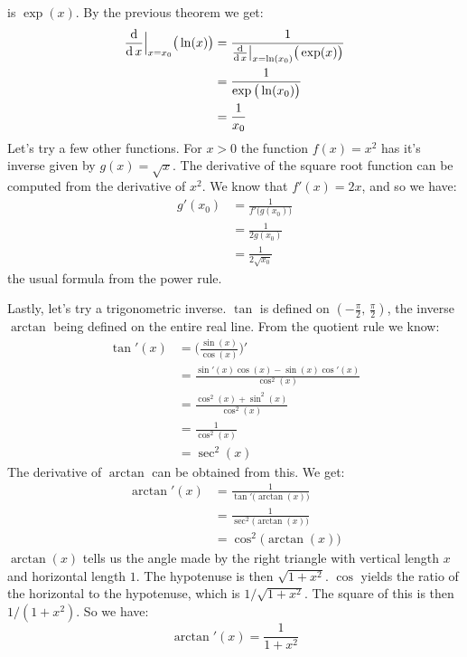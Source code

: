 \documentclass{article}
\theoremstyle{plain}
\begin{document}
    is $\exp(x)$. By the previous theorem we get:
    \begin{align}
        \frac{\textrm{d}}{\textrm{d}\,x}\Big|_{x=x_{0}}\big(\ln(x)\big)
            &=\frac{1}{%
                \frac{\textrm{d}}{\textrm{d}\,x}
                \big|_{x=\ln(x_{0})}\big(\exp(x)\big)%
            }\\
            &=\frac{1}{\exp\big(\ln(x_{0})\big)}\\
            &=\frac{1}{x_{0}}
    \end{align}
    Let's try a few other functions. For $x>0$ the function
    $f(x)=x^{2}$ has it's inverse given by $g(x)=\sqrt{x}$. The derivative
    of the square root function can be computed from the derivative of $x^2$.
    We know that $f'(x)=2x$, and so we have:
    \begin{align}
        g'(x_{0})&=\frac{1}{f'\big(g(x_{0})\big)}\\
            &=\frac{1}{2g(x_{0})}\\
            &=\frac{1}{2\sqrt{x_{0}}}
    \end{align}
    the usual formula from the power rule.
    \par\hfill\par
    Lastly, let's try a trigonometric inverse. $\tan$ is defined on
    $(-\frac{\pi}{2},\,\frac{\pi}{2})$, the inverse $\arctan$ being defined on
    the entire real line. From the quotient rule we know:
    \begin{align}
        \tan'(x)
            &=\Big(\frac{\sin(x)}{\cos(x)}\Big)'\\
            &=\frac{\sin'(x)\cos(x)-\sin(x)\cos'(x)}{\cos^{2}(x)}\\
            &=\frac{\cos^{2}(x)+\sin^{2}(x)}{\cos^{2}(x)}\\
            &=\frac{1}{\cos^{2}(x)}\\
            &=\sec^{2}(x)
    \end{align}
    The derivative of $\arctan$ can be obtained from this. We get:
    \begin{align}
        \arctan'(x)
            &=\frac{1}{\tan'\big(\arctan(x)\big)}\\
            &=\frac{1}{\sec^{2}\big(\arctan(x)\big)}\\
            &=\cos^{2}\big(\arctan(x)\big)
    \end{align}
    $\arctan(x)$ tells us the angle made by the right triangle with
    vertical length $x$ and horizontal length $1$. The hypotenuse is then
    $\sqrt{1+x^{2}}$. $\cos$ yields the ratio of the horizontal to the
    hypotenuse, which is $1/\sqrt{1+x^{2}}$. The square of this is then
    $1/(1+x^{2})$. So we have:
    \begin{equation}
        \arctan'(x)=\frac{1}{1+x^{2}}
    \end{equation}
\end{document}
